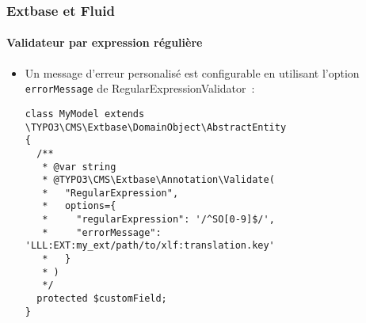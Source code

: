 %

\begin{frame}[fragile]
	\frametitle{Extbase et Fluid}
	\framesubtitle{Validateur par expression régulière}

	\lstset{basicstyle=\tiny\ttfamily}

	\begin{itemize}
		\item Un message d'erreur personalisé est configurable en utilisant l'option
			\texttt{errorMessage} de RegularExpressionValidator~:
\begin{lstlisting}
class MyModel extends \TYPO3\CMS\Extbase\DomainObject\AbstractEntity
{
  /**
   * @var string
   * @TYPO3\CMS\Extbase\Annotation\Validate(
   *   "RegularExpression",
   *   options={
   *     "regularExpression": '/^SO[0-9]$/',
   *     "errorMessage": 'LLL:EXT:my_ext/path/to/xlf:translation.key'
   *   }
   * )
   */
  protected $customField;
}
\end{lstlisting}

	\end{itemize}

\end{frame}

